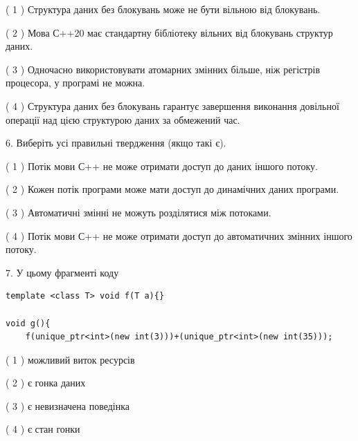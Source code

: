 \documentclass[12pt, ukrainian]{article}
\begin{document}
\begin {large}
{( 1 ) Структура даних без блокувань може не бути вільною від блокувань.%

( 2 ) Мова С++20 має стандартну бібліотеку вільних від блокувань структур даних.%

( 3 ) Одночасно використовувати атомарних змінних більше, ніж регістрів процесора, у програмі не можна.%

( 4 ) Структура даних без блокувань гарантує завершення виконання довільної операції над цією структурою даних за обмежений час.%
\newpage



\vspace{5mm}
6. Виберіть усі правильні твердження (якщо такі є).\par
\vspace{2mm}

( 1 ) Потік мови С++ не може отримати доступ до даних іншого потоку.%

( 2 ) Кожен потік програми може мати доступ до динамічних даних програми.%

( 3 ) Автоматичні змінні не можуть розділятися між потоками.%

( 4 ) Потік мови С++ не може отримати доступ до автоматичних змінних іншого потоку.%


\vspace{5mm}
7. У цьому фрагменті коду
\begin{verbatim}
template <class T> void f(T a){}

void g(){
    f(unique_ptr<int>(new int(3)))+(unique_ptr<int>(new int(35)));
\end{verbatim}

( 1 ) можливий виток ресурсів%

( 2 ) є гонка даних%

( 3 ) є невизначена поведінка%

( 4 ) є стан гонки%
}
\end {large}
\end{document}
